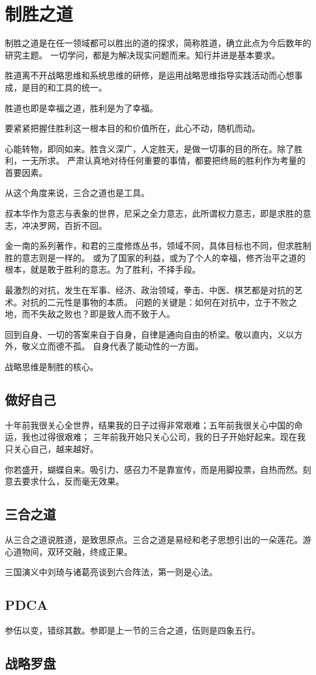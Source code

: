 \chapter{制胜之道}

制胜之道是在任一领域都可以胜出的道的探求，简称胜道，确立此点为今后数年的研究主题。
一切学问，都是为解决现实问题而来。知行并进是基本要求。

胜道离不开战略思维和系统思维的研修，是运用战略思维指导实践活动而心想事成，是目的和工具的统一。

胜道也即是幸福之道，胜利是为了幸福。

要紧紧把握住胜利这一根本目的和价值所在，此心不动，随机而动。

心能转物，即同如来。胜含义深广，人定胜天，是做一切事的目的所在。除了胜利，一无所求。
严肃认真地对待任何重要的事情，都要把终局的胜利作为考量的首要因素。

从这个角度来说，三合之道也是工具。

叔本华作为意志与表象的世界，尼采之全力意志，此所谓权力意志，即是求胜的意志，冲决罗网，百折不回。

金一南的系列著作，和君的三度修炼丛书，领域不同，具体目标也不同，但求胜制胜的意志则是一样的。
或为了国家的利益，或为了个人的幸福，修齐治平之道的根本，就是敢于胜利的意志。为了胜利，不择手段。

最激烈的对抗，发生在军事、经济、政治领域，拳击、中医、棋艺都是对抗的艺术。对抗的二元性是事物的本质。
问题的关键是：如何在对抗中，立于不败之地，而不失敌之败也？即是致人而不致于人。

回到自身、一切的答案来自于自身，自律是通向自由的桥梁。敬以直内，义以方外，敬义立而德不孤。
自身代表了能动性的一方面。

战略思维是制胜的核心。

\section{做好自己}

\begin{shadequote}

十年前我很关心全世界，结果我的日子过得非常艰难；五年前我很关心中国的命运，我也过得很艰难；
三年前我开始只关心公司，我的日子开始好起来。现在我只关心自己，越来越好。
\end{shadequote}

你若盛开，蝴蝶自来。吸引力、感召力不是靠宣传，而是用脚投票，自热而然。刻意去要求什么，反而毫无效果。

\section{三合之道}

从三合之道说胜道，是致思原点。三合之道是易经和老子思想引出的一朵莲花。游心道物间，双环交融，终成正果。

三国演义中刘琦与诸葛亮谈到六合阵法，第一则是心法。

\section{PDCA}

参伍以变，错综其数。参即是上一节的三合之道，伍则是四象五行。

\section{战略罗盘}
